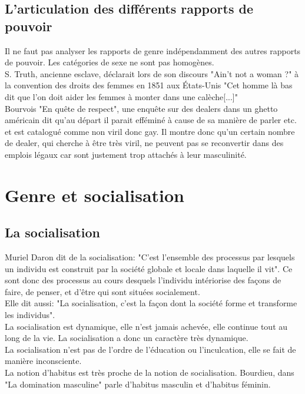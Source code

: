 \documentclass[10pt, a4paper, openany]{book}
\begin{document}
\section{L'articulation des différents rapports de pouvoir}

Il ne faut pas analyser les rapports de genre indépendamment des autres rapports de pouvoir. Les catégories de sexe ne sont pas homogènes. \\
S. Truth, ancienne esclave, déclarait lors de son discours "Ain't not a woman ?" à la convention des droits des femmes en 1851 aux États-Unis "Cet homme là bas dit que l'on doit aider les femmes à monter dans une calèche[...]" \\
Bourvois "En quête de respect", une enquête sur des dealers dans un ghetto américain dit qu'au départ il parait efféminé à cause de sa manière de parler etc. et est catalogué comme non viril donc gay. Il montre donc qu'un certain nombre de dealer, qui cherche à être très viril, ne peuvent pas se reconvertir dans des emplois légaux car sont justement trop attachés à leur masculinité.

\chapter{Genre et socialisation}

\section{La socialisation}

Muriel Daron dit de la socialisation: "C'est l'ensemble des processus par lesquels un individu est construit par la société globale et locale dans laquelle il vit". Ce sont donc des processus au cours desquels l'individu intériorise des façons de faire, de penser, et d'être qui sont situées socialement. \\
Elle dit aussi: "La socialisation, c'est la façon dont la société forme et transforme les individus". \\
La socialisation est dynamique, elle n'est jamais achevée, elle continue tout au long de la vie. La socialisation a donc un caractère très dynamique. \\
La socialisation n'est pas de l'ordre de l'éducation ou l'inculcation, elle se fait de manière inconsciente. \\
La notion d'habitus est très proche de la notion de socialisation. Bourdieu, dans "La domination masculine" parle d'habitus masculin et d'habitus féminin. 
\end{document}
